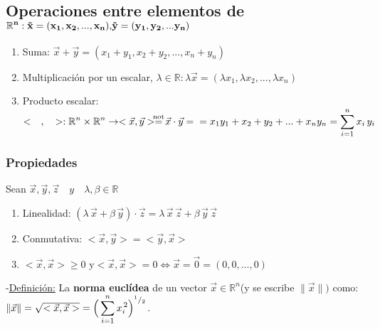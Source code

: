 \documentclass[12pt, titlepage]{article}
\newcommand{\eqc}[1]{\stackrel{\mathclap{\normalfont\mbox{\scriptsize{#1}}}}{=}}
\begin{document}

\subsection{Operaciones entre elementos de $\mathbf{\displaystyle \mathbb{R}^n : \vec{x}=(x_1, x_2, ..., x_n),} \\ \mathbf{ \vec{y}=(y_1, y_2, ... y_n)}$}

\begin {enumerate}

\item Suma: $\vec{x}+\vec{y}=(x_1+y_1, x_2+y_2, ..., x_n+y_n)$

\item Multiplicación por un escalar, $\lambda \in \mathbb{R}: \lambda \vec{x}=(\lambda x_1, \lambda x_2, ..., \lambda x_n)$

\item Producto escalar: $<\quad ,\quad > : \displaystyle \mathbb{R}^n \times \displaystyle \mathbb{R}^n \rightarrow <\vec{x}, \vec{y}>\displaystyle \eqc{not} \vec{x} \cdot \vec{y}= \\
=  x_1y_1+x_2+y_2+...+x_ny_n = \displaystyle \sum_{i=1}^n x_i\,y_i$

\end {enumerate}


\subsubsection*{Propiedades}
 Sean $\vec{x}, \vec{y}, \vec{z} \quad y \quad \lambda , \beta \in \displaystyle \mathbb{R}$

\begin{enumerate}

\item Linealidad: $(\lambda \, \vec{x} + \beta \, \vec{y}) \cdot \vec{z} = \lambda \, \vec{x} \, \vec{z} + \beta \, \vec{y} \, \vec{z}$

\item Conmutativa: $<\vec{x}, \vec{y}>=<\vec{y}, \vec{x}>$

\item $< \vec{x}, \vec{x} > \geq 0  \, \, \mathrm{y} < \vec{x}, \vec{x} > = 0 \iff \vec{x} = \vec{0} = (0, 0,..., 0)$

\end{enumerate}


\noindent -\underline{Definición:} La \textbf{norma euclídea} de un vector $\vec{x} \in \displaystyle \mathbb{R}^n$(y se escribe $\|\vec{x}\| \mathrm{)}$ como: $\|\vec{x}\| = \sqrt{<\vec{x}, \vec{x}>} = \Big{(}\displaystyle \sum_{i = 1}^{n} x_i^{\,2}\Big{)}^{^1/_2}$.
\end{document}
